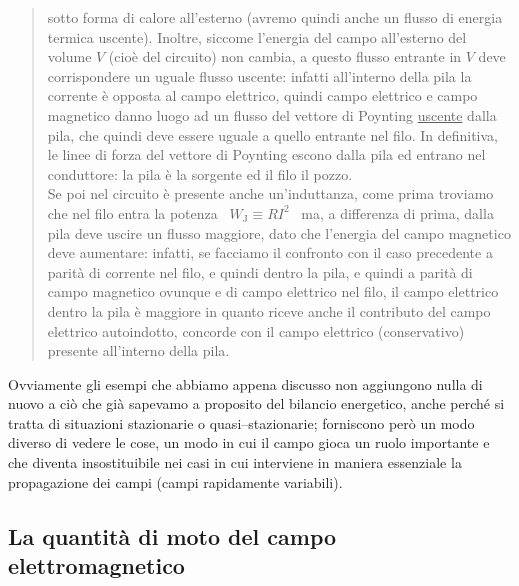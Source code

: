 \begin{quote}
  sotto forma di calore all'esterno (avremo quindi anche un flusso di energia
  termica uscente). Inoltre, siccome l'energia del campo all'esterno del volume
  $V$ (cio\`e del circuito) non cambia, a questo flusso entrante in $V$ deve
  corrispondere un uguale flusso uscente: infatti all'interno della pila la
  corrente \`e opposta al campo elettrico, quindi campo elettrico e campo
  magnetico danno luogo ad un flusso del vettore di Poynting \underline{uscente}
  dalla pila, che quindi deve
  essere uguale a quello entrante nel filo. In definitiva, le linee di forza del
  vettore di Poynting escono dalla pila ed entrano nel conduttore: la pila \`e
  la sorgente ed il filo il pozzo.\\
  Se poi nel circuito \`e presente anche un'induttanza, come prima troviamo che
  nel filo entra la potenza \ $W_\mathrm{J}\equiv RI^2$ \ ma, a differenza di
  prima, dalla pila deve uscire un flusso maggiore, dato che l'energia del campo
  magnetico deve aumentare: infatti, se facciamo il confronto con il caso
  precedente a parit\`a di corrente nel filo, e quindi dentro la pila, e quindi
  a parit\`a di campo magnetico ovunque e di campo elettrico nel filo, il campo
  elettrico dentro la pila \`e maggiore in quanto riceve anche il contributo del
  campo elettrico autoindotto, concorde con il campo elettrico (conservativo)
  presente all'interno della pila.
\end{quote}

Ovviamente gli esempi che abbiamo appena discusso non aggiungono nulla di nuovo
a ci\`o che gi\`a sapevamo a proposito del bilancio energetico, anche perch\'e
si tratta di situazioni stazionarie o quasi--stazionarie; forniscono per\`o un
modo diverso di vedere le cose, un modo in cui il campo gioca un ruolo
importante e che diventa insostituibile nei casi in cui interviene in maniera
essenziale la propagazione dei campi (campi rapidamente variabili).

\subsection{La quantit\`a di moto del campo elettromagnetico}

